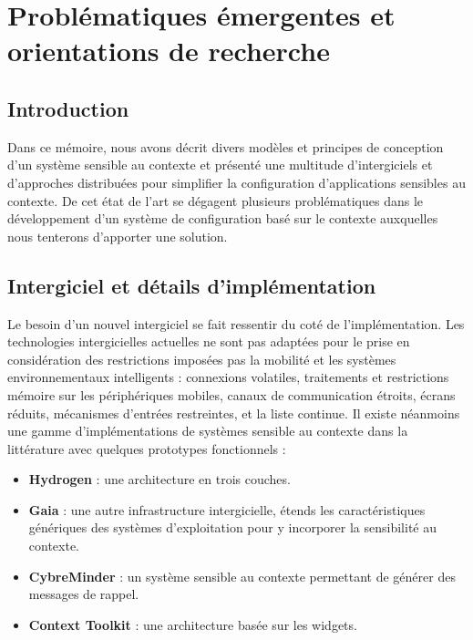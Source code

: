 \chapter{Problématiques émergentes et orientations de recherche}

\section{Introduction}

Dans ce mémoire, nous avons décrit divers modèles et principes de conception
d'un système sensible au contexte et présenté une multitude d'intergiciels et
d'approches distribuées pour simplifier la configuration d'applications
sensibles au contexte. De cet état de l'art se dégagent plusieurs problématiques
dans le développement d'un système de configuration basé sur le contexte
auxquelles nous tenterons d'apporter une solution.

\section{Intergiciel et détails d'implémentation}

Le besoin d'un nouvel intergiciel se fait ressentir du coté de l'implémentation.
Les technologies intergicielles actuelles ne sont pas adaptées pour le prise en
considération des restrictions imposées pas la mobilité et les systèmes
environnementaux intelligents : connexions volatiles, traitements et restrictions
mémoire sur les périphériques mobiles, canaux de communication étroits, écrans
réduits, mécanismes d'entrées restreintes, et la liste continue. Il existe
néanmoins une gamme d'implémentations de systèmes sensible au contexte dans la
littérature avec quelques prototypes fonctionnels :

\begin{itemize}
    \item \textbf{Hydrogen} \cite{hofer_context-awareness_2003}: 
        une architecture en trois couches.
    \item \textbf{Gaia} \cite{chetan_mobile_2005}: 
        une autre infrastructure intergicielle, étends les caractéristiques
        génériques des systèmes d'exploitation pour y incorporer la
        sensibilité au contexte.
    \item \textbf{CybreMinder} \cite{abowd_context-aware_2002}: 
        un système sensible au contexte permettant de générer des messages
        de rappel.
    \item \textbf{Context Toolkit} \cite{dey_conceptual_2001}: 
	    une architecture basée sur les widgets.
\end{itemize}

